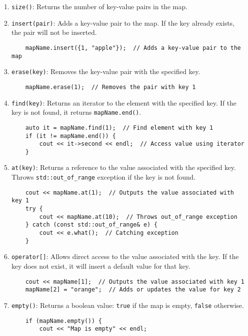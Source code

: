 \documentclass{article}
\begin{document}
\begin{enumerate}
    \item \texttt{size()}: Returns the number of key-value pairs in the map.
    \item \texttt{insert(pair)}: Adds a key-value pair to the map. If the key already exists, the pair will not be inserted.
    \begin{lstlisting}
    mapName.insert({1, "apple"});  // Adds a key-value pair to the map
    \end{lstlisting}
    \item \texttt{erase(key)}: Removes the key-value pair with the specified key.
    \begin{lstlisting}
    mapName.erase(1);  // Removes the pair with key 1
    \end{lstlisting}
    \item \texttt{find(key)}: Returns an iterator to the element with the specified key. If the key is not found, it returns \texttt{mapName.end()}.
    \begin{lstlisting}
    auto it = mapName.find(1);  // Find element with key 1
    if (it != mapName.end()) {
        cout << it->second << endl;  // Access value using iterator
    }
    \end{lstlisting}
    \item \texttt{at(key)}: Returns a reference to the value associated with the specified key. Throws \texttt{std::out\_of\_range} exception if the key is not found.
    \begin{lstlisting}
    cout << mapName.at(1);  // Outputs the value associated with key 1
    try {
        cout << mapName.at(10);  // Throws out_of_range exception
    } catch (const std::out_of_range& e) {
        cout << e.what();  // Catching exception
    }
    \end{lstlisting}
    \item \texttt{operator[]}: Allows direct access to the value associated with the key. If the key does not exist, it will insert a default value for that key.
    \begin{lstlisting}
    cout << mapName[1];  // Outputs the value associated with key 1
    mapName[2] = "orange";  // Adds or updates the value for key 2
    \end{lstlisting}
    \item \texttt{empty()}: Returns a boolean value: \texttt{true} if the map is empty, \texttt{false} otherwise.
    \begin{lstlisting}
    if (mapName.empty()) {
        cout << "Map is empty" << endl;

\end{lstlisting}
\end{enumerate}
\end{document}

